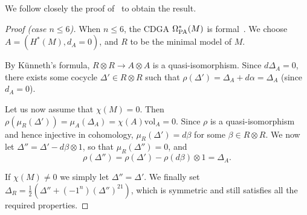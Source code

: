 We follow closely the proof of~\cite{LambrechtsStanley2008} to obtain the result.

\begin{proof}[Proof (case $n \leq 6$)]
  When $n \leq 6$, the CDGA $\Omega_{\mathrm{PA}}^{*}(M)$ is formal~\cite[Proposition 4.6]{NeisendorferMiller1978}.
  We choose $A = (H^{*}(M), d_{A} = 0)$, and $R$ to be the minimal model of $M$.

  By Künneth's formula, $R \otimes R \to A \otimes A$ is a quasi-isomorphism.
  Since $d \Delta_{A} = 0$, there exists some cocycle $\Delta' \in R \otimes R$ such that $\rho(\Delta') = \Delta_{A} + d \alpha = \Delta_{A}$ (since $d_{A} = 0$).

  Let us now assume that $\chi(M) = 0$.
  Then $\rho(\mu_{R}(\Delta')) = \mu_{A}(\Delta_{A}) = \chi(A) \mathrm{vol}_{A} = 0$.
  Since $\rho$ is a quasi-isomorphism and hence injective in cohomology, $\mu_{R}(\Delta') = d\beta$ for some $\beta \in R \otimes R$.
  We now let $\Delta'' = \Delta' - d\beta \otimes 1$, so that $\mu_{R}(\Delta'') = 0$, and
  \[ \rho(\Delta'') = \rho(\Delta') - \rho(d\beta) \otimes 1 = \Delta_{A}.\]

  If $\chi(M) \neq 0$ we simply let $\Delta'' = \Delta'$.
  We finally set $\Delta_{R} = \frac{1}{2} (\Delta'' + (-1^{n}) (\Delta'')^{21})$, which is symmetric and still satisfies all the required properties.
\end{proof}

